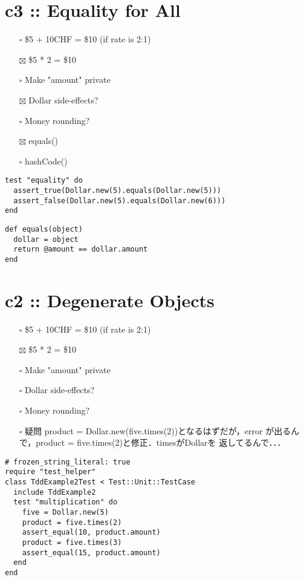 \documentclass[11pt]{article}
\begin{document}
\section{c3 :: Equality for All}
\label{sec:orgc153e61}
\begin{itemize}
\item[{$\square$}] \$5 + 10CHF = \$10 (if rate is 2:1)
\item[{$\boxtimes$}] \$5 * 2 = \$10
\item[{$\square$}] Make "amount" private
\item[{$\boxtimes$}] Dollar side-effects?
\item[{$\square$}] Money rounding?
\item[{$\boxtimes$}] equals()
\item[{$\square$}] hashCode()
\end{itemize}

\begin{verbatim}
test "equality" do
  assert_true(Dollar.new(5).equals(Dollar.new(5)))
  assert_false(Dollar.new(5).equals(Dollar.new(6)))
end
\end{verbatim}

\begin{verbatim}
def equals(object)
  dollar = object
  return @amount == dollar.amount
end
\end{verbatim}

\section{c2 :: Degenerate Objects}
\label{sec:orgf58e0b7}
\begin{itemize}
\item[{$\square$}] \$5 + 10CHF = \$10 (if rate is 2:1)
\item[{$\boxtimes$}] \$5 * 2 = \$10
\item[{$\square$}] Make "amount" private
\item[{$\square$}] Dollar side-effects?
\item[{$\square$}] Money rounding?

\item[{$\square$}] 疑問
product = Dollar.new(five.times(2))となるはずだが，error
が出るんで，product = five.times(2)と修正．timesがDollarを
返してるんで．．．
\end{itemize}


\begin{verbatim}
# frozen_string_literal: true
require "test_helper"
class TddExample2Test < Test::Unit::TestCase
  include TddExample2
  test "multiplication" do
    five = Dollar.new(5)
    product = five.times(2)
    assert_equal(10, product.amount)
    product = five.times(3)
    assert_equal(15, product.amount)
  end
end
\end{verbatim}
\end{document}
